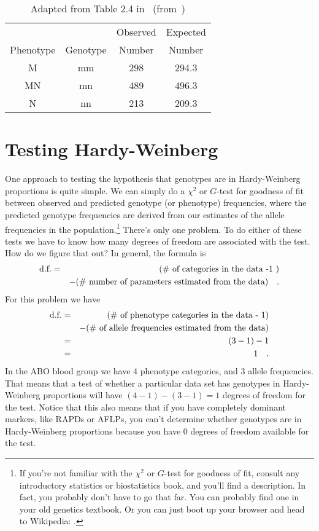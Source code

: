 \begin{table}
\begin{center}
\begin{tabular}{cccc}
\hline\hline
          &          & Observed & Expected \\
Phenotype & Genotype & Number   & Number   \\
\hline
M         & mm       & 298      & 294.3 \\
MN        & mn       & 489      & 496.3 \\
N         & nn       & 213      & 209.3 \\
\hline
\end{tabular}
\end{center}
\caption{Adapted from Table 2.4 in~\cite{Hedrick-2000}
  (from~\cite{Cleghorn-1960})}\label{table:MN-data}
\end{table}

\section*{Testing Hardy-Weinberg}

One approach to testing the hypothesis that genotypes are in
Hardy-Weinberg proportions is quite simple. We can simply do a
$\chi^2$ or $G$-test for goodness of fit between observed and
predicted genotype (or phenotype) frequencies, where the predicted
genotype frequencies are derived from our estimates of the allele
frequencies in the population.\footnote{If you're not familiar with
  the $\chi^2$ or $G$-test for goodness of fit, consult any
  introductory statistics or biostatistics book, and you'll find a
  description. In fact, you probably don't have to go that far. You
  can probably find one in your old genetics textbook. Or you can just
  boot up your browser and head to Wikipedia:
  . } There's only one problem. To do
either of these tests we have to know how many degrees of freedom are
associated with the test. How do we figure that out? In general, the
formula is
\begin{eqnarray*}
\hbox{d.f.} &=& (\hbox{\# of categories in the data -1 }) \\
&&- (\hbox{\#
              number of parameters estimated from the data}) \quad .
\end{eqnarray*}
For this problem we have
\begin{eqnarray*}
\hbox{d.f.} &=& (\hbox{\# of phenotype categories in the data - 1}) \\
&&- (\hbox{\# of allele frequencies estimated from the data}) \\
&=& (3-1) - 1 \\
&=& 1 \quad .
\end{eqnarray*}
In the ABO blood group we have 4 phenotype categories, and 3
allele frequencies. That means that a test of whether a particular
data set has genotypes in Hardy-Weinberg proportions will have
$(4-1)-(3-1) = 1$ degrees of freedom for the test. Notice that this
also means that if you have completely dominant markers, like RAPDs or
AFLPs, you can't determine whether genotypes are in Hardy-Weinberg
proportions because you have 0 degrees of freedom available for the
test.

